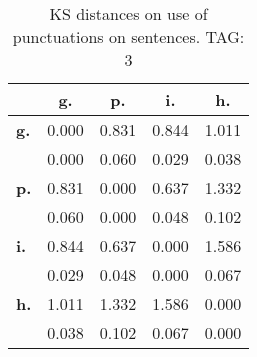 \begin{table}[h!]
\begin{center}
\begin{tabular}{| l || c | c | c | c |}\hline
 & {\bf g.} & {\bf p.} & {\bf i.} & {\bf h.} \\\hline\hline
{\bf g.} & 0.000 & 0.831 & 0.844 & 1.011 \\
{\bf } & 0.000 & 0.060 & 0.029 & 0.038 \\\hline
{\bf p.} & 0.831 & 0.000 & 0.637 & 1.332 \\
{\bf } & 0.060 & 0.000 & 0.048 & 0.102 \\\hline
{\bf i.} & 0.844 & 0.637 & 0.000 & 1.586 \\
{\bf } & 0.029 & 0.048 & 0.000 & 0.067 \\\hline
{\bf h.} & 1.011 & 1.332 & 1.586 & 0.000 \\
{\bf } & 0.038 & 0.102 & 0.067 & 0.000 \\\hline
\end{tabular}
\caption{KS distances on use of punctuations on sentences. TAG: 3}
\end{center}
\end{table}